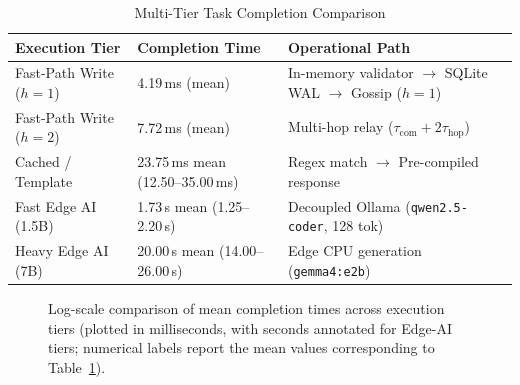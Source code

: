 \begin{table}[!t]
\caption{Multi-Tier Task Completion Comparison}
\label{tab:tier-comparison}
\centering
\scriptsize
\begin{tabular}{@{}p{2.4cm}p{2.2cm}p{3.4cm}@{}}
\toprule
\textbf{Execution Tier} & \textbf{Completion Time} & \textbf{Operational Path} \\
\midrule
Fast-Path Write ($h=1$) & 4.19\,ms (mean) & In-memory validator $\to$ SQLite WAL $\to$ Gossip ($h=1$) \\
Fast-Path Write ($h=2$) & 7.72\,ms (mean) & Multi-hop relay ($\tau_{\text{com}} + 2\tau_{\text{hop}}$) \\
Cached / Template & 23.75\,ms mean \newline (12.50--35.00\,ms) & Regex match $\to$ Pre-compiled response \\
Fast Edge AI (1.5B) & 1.73\,s mean \newline (1.25--2.20\,s) & Decoupled Ollama (\texttt{qwen2.5-coder}, 128 tok) \\
Heavy Edge AI (7B)  & 20.00\,s mean \newline (14.00--26.00\,s) & Edge CPU generation (\texttt{gemma4:e2b}) \\
\bottomrule
\end{tabular}
\end{table}

\begin{figure}[!t]
\centering
{}
\caption{Log-scale comparison of mean completion times across execution tiers (plotted in milliseconds, with seconds annotated for Edge-AI tiers; numerical labels report the mean values corresponding to Table~\ref{tab:tier-comparison}).}
\label{fig:tier_comparison}
\end{figure}

